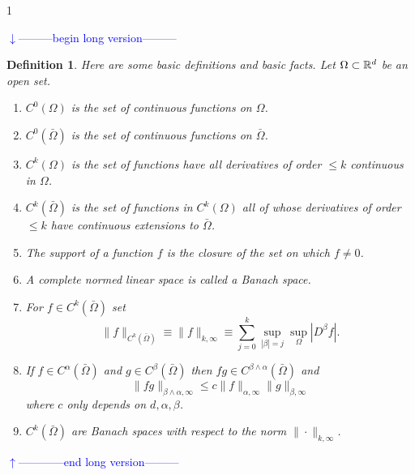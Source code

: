 \documentclass[noinfoline]{imsart}
\newtheorem{definition}{Definition}
\def\Ver{1}
\def\LongVer{1}
\begin{document}
\if\Ver\LongVer{ 
{\flushleft\textcolor{blue}{$\downarrow$---------begin long version---------}}\newline

\begin{definition}
Here are some basic definitions and basic facts. Let $\Omega \subset \Bbb R^d$ be an open set. 
\begin{enumerate}
\item $C^0(\Omega)$ is the set of continuous functions on $\Omega$.
\item $C^0(\bar\Omega)$ is the set of continuous functions on $\bar\Omega$.
\item $C^k(\Omega)$ is the set of functions have all derivatives of order $\leq k$ continuous in $\Omega$.
\item $C^k(\bar\Omega)$ is the set of functions in $C^k(\Omega)$ all of whose derivatives of order $\leq k$ have continuous extensions to $\bar\Omega$.
\item The {\em support } of a function $f$ is the closure of the set on which $f\neq 0$.
\item A complete normed linear space is called a {\em Banach space}.
\item For $f\in C^k(\bar\Omega)$ set 
\[ \| f \|_{C^k(\bar \Omega)}\equiv \| f \|_{k,\infty}\equiv \sum_{j=0}^k \sup_{|\beta|=j}\sup_{\Omega} |D^\beta f|.\]
\item If $f\in C^\alpha(\bar\Omega)$ and $g\in C^\beta(\bar\Omega)$ then $fg \in C^{\beta\wedge \alpha}(\bar\Omega)$ and 
\[ \|fg  \|_{\beta\wedge \alpha,\infty}\leq c \|f  \|_{ \alpha,\infty}\|g  \|_{\beta,\infty}  \]
where $c$ only depends on $d,\alpha, \beta$.
\item  $C^k(\bar\Omega)$ are Banach spaces with respect to the norm $\| \cdot \|_{k,\infty}$.
\end{enumerate}
\end{definition}

{\flushleft\textcolor{blue}{$\uparrow$------------end long version---------}}\newline
} \fi
\end{document}
